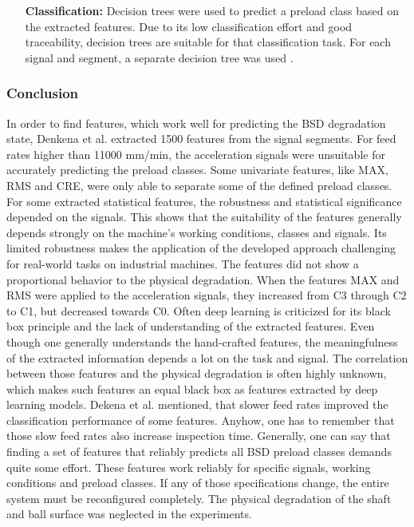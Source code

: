 \begin{itemize}
    \item [\textbf{Classification:}] Decision trees were used to predict a preload class based on the extracted features. Due to its low classification effort and good traceability, decision trees are suitable for that classification task. For each signal and segment, a separate decision tree was used \cite{Denkena2021}. 
\end{itemize}

\subsubsection{Conclusion}
In order to find features, which work well for predicting the BSD degradation state, Denkena et al. \cite{Denkena2021} extracted 1500 features from the signal segments. For feed rates higher than 11000 mm/min, the acceleration signals were unsuitable for accurately predicting the preload classes. Some univariate features, like MAX, RMS and CRE, were only able to separate some of the defined preload classes. For some extracted statistical features, the robustness and statistical significance depended on the signals. This shows that the suitability of the features generally depends strongly on the machine's working conditions, classes and signals.
Its limited robustness makes the application of the developed approach challenging for real-world tasks on industrial machines. The features did not show a proportional behavior to the physical degradation. When the features MAX and RMS were applied to the acceleration signals, they increased from C3 through C2 to C1, but decreased towards C0. Often deep learning is criticized for its black box principle and the lack of understanding of the extracted features. Even though one generally understands the hand-crafted features, the meaningfulness of the extracted information depends a lot on the task and signal. The correlation between those features and the physical degradation is often highly unknown, which makes such features an equal black box as features extracted by deep learning models. Dekena et al. \cite{Denkena2021} mentioned, that slower feed rates improved the classification performance of some features. Anyhow, one has to remember that those slow feed rates also increase inspection time. Generally, one can say that finding a set of features that reliably predicts all BSD preload classes demands quite some effort. These features work reliably for specific signals, working conditions and preload classes. If any of those specifications change, 
the entire system must be reconfigured completely. The physical degradation of the shaft and ball surface was neglected in the experiments.


